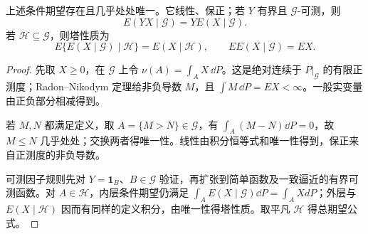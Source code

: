 \begin{theorem}
上述条件期望存在且几乎处处唯一。它线性、保正；若 $Y$ 有界且 $\mathcal G$-可测，则
\[
 E(YX\mid\mathcal G)=YE(X\mid\mathcal G).
\]
若 $\mathcal H\subseteq\mathcal G$，则塔性质为
\[
 E\{E(X\mid\mathcal G)\mid\mathcal H\}=E(X\mid\mathcal H),
 \qquad E E(X\mid\mathcal G)=EX.
\]
\end{theorem}
\begin{proof}
先取 $X\ge0$，在 $\mathcal G$ 上令 $\nu(A)=\int_AX\,\dd P$。这是绝对连续于 $P|_{\mathcal G}$ 的有限正测度；Radon--Nikodym 定理给非负导数 $M$，且 $\int M\,\dd P=EX<\infty$。一般实变量由正负部分相减得到。

若 $M,N$ 都满足定义，取 $A=\{M>N\}\in\mathcal G$，有 $\int_A(M-N)\dd P=0$，故 $M\le N$ 几乎处处；交换两者得唯一性。线性由积分恒等式和唯一性得到，保正来自正测度的非负导数。

可测因子规则先对 $Y=\mathbf1_B$、$B\in\mathcal G$ 验证，再扩张到简单函数及一致逼近的有界可测函数。对 $A\in\mathcal H$，内层条件期望仍满足 $\int_AE(X\mid\mathcal G)\dd P=\int_AXdP$；外层与 $E(X\mid\mathcal H)$ 因而有同样的定义积分，由唯一性得塔性质。取平凡 $\mathcal H$ 得总期望公式。
\end{proof}

